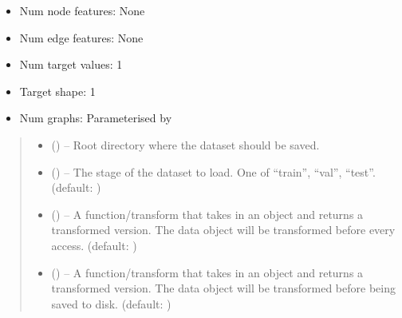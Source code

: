 \documentclass[letterpaper,10pt,english]{sphinxhowto}
\begin{document}
\begin{fulllineitems}
\begin{itemize}
\item {} 
\sphinxAtStartPar
Num node features: None

\item {} 
\sphinxAtStartPar
Num edge features: None

\item {} 
\sphinxAtStartPar
Num target values: 1

\item {} 
\sphinxAtStartPar
Target shape: 1

\item {} 
\sphinxAtStartPar
Num graphs: Parameterised by 

\end{itemize}
\begin{quote}\begin{description}
\begin{itemize}
\item {} 
\sphinxAtStartPar
{} () – Root directory where the dataset should be saved.

\item {} 
\sphinxAtStartPar
{} () – The stage of the dataset to load. One of “train”, “val”, “test”. (default: )

\item {} 
\sphinxAtStartPar
{} (\sphinxstyleliteralemphasis{\sphinxupquote{, }}) – A function/transform that takes in an  object and returns a transformed version. The data object will be transformed before every access. (default: )

\item {} 
\sphinxAtStartPar
{} (\sphinxstyleliteralemphasis{\sphinxupquote{, }}) – A function/transform that takes in an  object and returns a transformed version. The data object will be transformed before being saved to disk. (default: )


\end{itemize}
\end{description}
\end{quote}
\end{fulllineitems}
\end{document}
